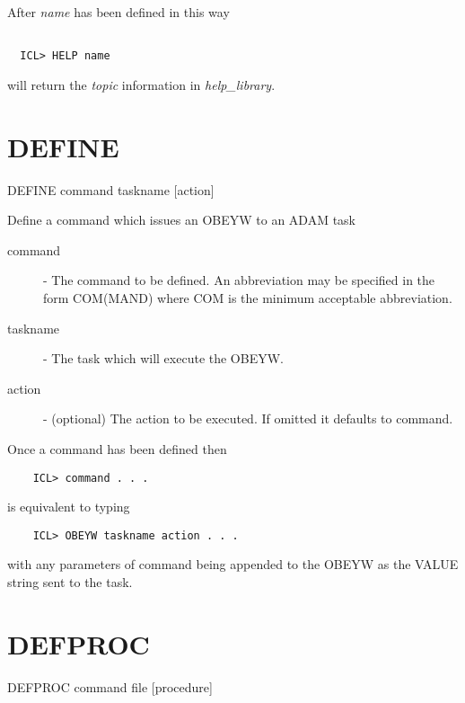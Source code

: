 \documentclass[twoside,11pt]{report}
\newcommand{\xlabel}[1]{}
\begin{document}
After {\em name} has been defined in this way
\begin{verbatim}

  ICL> HELP name

\end{verbatim}
will return the {\em topic}  information in {\em help\_library}.

\section{\xlabel{DEFINE}DEFINE\label{DEFINE}}

   DEFINE \hspace{.5cm} command \hspace{.5cm} taskname \hspace{.5cm} [action]

 Define a command which issues an OBEYW to an ADAM task

\begin{description}

\item[command] - The command to be defined. An abbreviation
              may be specified in the form COM(MAND) where
              COM is the minimum acceptable abbreviation.

\item[taskname] - The task which will execute the OBEYW.

\item[action] - (optional)  The action to be executed. If
              omitted it defaults to command.

\end{description}
Once a command has been defined then
\begin{verbatim}
    ICL> command . . .
\end{verbatim}
is equivalent to typing 
\begin{verbatim}
    ICL> OBEYW taskname action . . .
\end{verbatim}
with any parameters of command being appended to the OBEYW as the VALUE
string sent to the task.

\section{\xlabel{DEFPROC}DEFPROC\label{DEFPROC}}

   DEFPROC \hspace{.5cm} command \hspace{.5cm} file \hspace{.5cm} [procedure]
\end{document}
